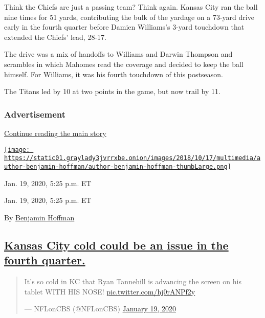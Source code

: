 Think the Chiefs are just a passing team? Think again. Kansas City ran
the ball nine times for 51 yards, contributing the bulk of the yardage
on a 73-yard drive early in the fourth quarter before Damien Williams's
3-yard touchdown that extended the Chiefs' lead, 28-17.

The drive was a mix of handoffs to Williams and Darwin Thompson and
scrambles in which Mahomes read the coverage and decided to keep the
ball himself. For Williams, it was his fourth touchdown of this
postseason.

The Titans led by 10 at two points in the game, but now trail by 11.

\hypertarget{advertisement-1}{%
\subsubsection{Advertisement}\label{advertisement-1}}

\protect\hyperlink{after-dfp-ad-mid2}{Continue reading the main story}

\href{https://www.nytimes3xbfgragh.onion/by/benjamin-hoffman}{\texttt{[image: https://static01.graylady3jvrrxbe.onion/images/2018/10/17/multimedia/author-benjamin-hoffman/author-benjamin-hoffman-thumbLarge.png]}}

Jan. 19, 2020, 5:25 p.m. ET

Jan. 19, 2020, 5:25 p.m. ET

By
\href{https://www.nytimes3xbfgragh.onion/by/benjamin-hoffman}{Benjamin
Hoffman}

\hypertarget{kansas-city-cold-could-be-an-issue-in-the-fourth-quarter}{%
\subsection{\texorpdfstring{\protect\hyperlink{kansas-city-cold-could-be-an-issue-in-the-fourth-quarter}{Kansas
City cold could be an issue in the fourth
quarter.}}{Kansas City cold could be an issue in the fourth quarter.}}\label{kansas-city-cold-could-be-an-issue-in-the-fourth-quarter}}

\begin{quote}
It's so cold in KC that Ryan Tannehill is advancing the screen on his
tablet WITH HIS NOSE!
\href{https://t.co/hj0rANPf2y}{pic.twitter.com/hj0rANPf2y}

--- NFLonCBS (@NFLonCBS)
\href{https://twitter.com/NFLonCBS/status/1219019916935942144?ref_src=twsrc\%5Etfw}{January
19, 2020}
\end{quote}

